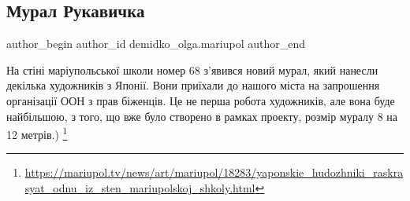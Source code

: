  
 
 
 
 

\subsection{Мурал Рукавичка}
\label{sec:29_07_2017.fb.demidko_olga.mariupol.1.na_st_n__mar_upolsko}

\ifcmt
 author_begin
   author_id demidko_olga.mariupol
 author_end
\fi

На стіні маріупольської школи номер 68 з'явився новий мурал, який нанесли
декілька художників з Японії. Вони приїхали до нашого міста на запрошення
організації ООН з прав біженців. Це не перша робота художників, але вона буде
найбільшою, з того, що вже було створено в рамках проекту, розмір муралу 8 на
12 метрів.) 
\footnote{\url{https://mariupol.tv/news/art/mariupol/18283/yaponskie_hudozhniki_raskrasyat_odnu_iz_sten_mariupolskoj_shkoly.html}}

